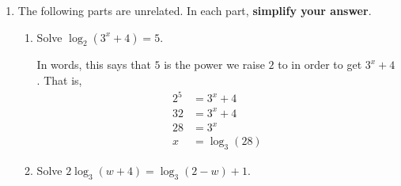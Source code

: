 \documentclass{article}
\theoremstyle{theorem}
\begin{document}
\begin{enumerate}
\begin{enumerate}
  \item
    \begin{problem}[\vfill\newpage]
      Put the following quantities in ascending order. Justify your answer. 
    \end{problem}

    \begin{solution}
      Since $A$ is concave up on $(0, 20)$, we know $A''(10)$ is positive. Since $A(t)$ is concave down on $(20, 45)$, we know $A''(25)$ is negative. And since $A(t)$ is linear on $(45, 53)$, we know $A''(50) = 0$. So, . 
    \end{solution}

  \end{enumerate}

\item {} 

  The following parts are unrelated. In each part, \textbf{simplify your answer}. 

  \begin{enumerate}

  \item 
    \begin{problem}[\vfill]
      Solve $\log_2 \left( 3^x + 4 \right) = 5$.
    \end{problem}

    \begin{solution}
      In words, this says that $5$ is the power we raise $2$ to in order to get $3^x + 4$. That is,
      \begin{align*}
        2^5 &= 3^x + 4 \\
        32 &= 3^x + 4\\
        28 &= 3^x \\
        x &= \boxed{\log_3 (28)}
      \end{align*}
    \end{solution}

  \item
    \begin{problem}[\vfill\newpage]
      Solve $2 \log_3 (w + 4) = \log_3(2 - w) + 1$.
    \end{problem}


\end{enumerate}
\end{enumerate}
\end{document}
